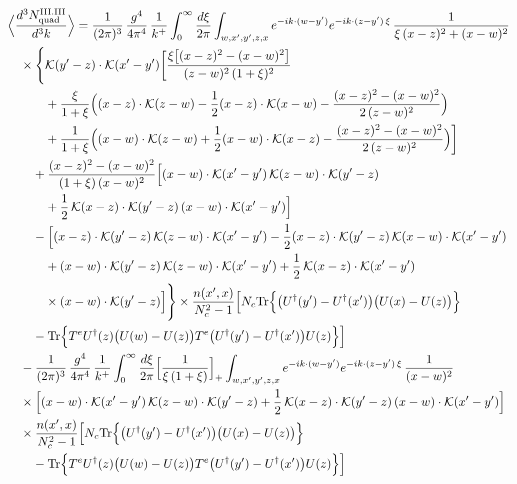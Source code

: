 \begingroup\small
\begin{align}\label{eq:S-III.III-2o}
&\Big\langle\frac{d^{3}N^{\rm III.III}_{{\rm quad}}}{d^{3}k}\Big\rangle=\frac{1}{(2\pi)^{3}}\, \frac{g^{4}}{4\pi^{4}}\, \frac{1}{k^{+}} \int_{0}^{\infty}\frac{d\xi}{2\pi} \int_{w,x',y',z,x}e^{-ik\cdot(w-y')}e^{-ik\cdot(z-y')\,\xi}\, \frac{1}{\xi\,(x-z)^{2}+(x-w)^{2}}\notag\\
&\quad \times\Bigg\{\Kv(y'-z)\cdot\Kv(x'-y')\bigg[\frac{\xi\big[(x-z)^{2}-(x-w)^{2}\big]}{(z-w)^{2}\,(1+\xi)^{2}}\notag\\
&\quad\quad\quad +\frac{\xi}{1+\xi}\Big((x-z)\cdot\Kv(z-w)-\frac{1}{2}(x-z)\cdot\Kv(x-w)-\frac{(x-z)^{2}-(x-w)^{2}}{2\,(z-w)^{2}}\Big)\notag\\
&\quad\quad\quad +\frac{1}{1+\xi}\Big((x-w)\cdot\Kv(z-w)+\frac{1}{2}(x-w)\cdot\Kv(x-z)-\frac{(x-z)^{2}-(x-w)^{2}}{2\,(z-w)^{2}}\Big)\bigg]\notag\\
&\quad\quad +\frac{(x-z)^{2}-(x-w)^{2}}{(1+\xi)\,(x-w)^{2}}\Big[(x-w)\cdot\Kv(x'-y')\, \Kv(z-w)\cdot\Kv(y'-z)\notag\\
&\quad\quad\quad +\frac{1}{2}\, \Kv(x-z)\cdot\Kv(y'-z)\, (x-w)\cdot\Kv(x'-y')\Big]\notag\\
&\quad\quad -\Big[(x-z)\cdot\Kv(y'-z)\, \Kv(z-w)\cdot\Kv(x'-y') -\frac{1}{2}(x-z)\cdot\Kv(y'-z)\, \Kv(x-w)\cdot\Kv(x'-y')\notag\\
&\quad\quad\quad +(x-w)\cdot\Kv(y'-z)\, \Kv(z-w)\cdot\Kv(x'-y') +\frac{1}{2}\, \Kv(x-z)\cdot\Kv(x'-y')\notag\\
&\quad\quad\quad \times (x-w)\cdot\Kv(y'-z)\Big]\Bigg\} \times\frac{n(x',x)}{N_{c}^{2}-1}\Big[ N_{c}{\rm Tr}\Big\{\big(U^{\dagger}(y')-U^{\dagger}(x')\big)\big(U(x)-U(z)\big)\Big\}\notag\\
&\quad\quad -{\rm Tr}\Big\{T^{e}U^{\dagger}(z)\big(U(w)-U(z)\big)T^{e}\big(U^{\dagger}(y')-U^{\dagger}(x')\big)U(z)\Big\}\Big]\notag\\
&\quad -\frac{1}{(2\pi)^{3}}\, \frac{g^{4}}{4\pi^{4}}\, \frac{1}{k^{+}} \int_{0}^{\infty}\frac{d\xi}{2\pi}\Big[\frac{1}{\xi\,(1+\xi)}\Big]_{+} \int_{w,x',y',z,x}e^{-ik\cdot(w-y')}e^{-ik\cdot(z-y')\,\xi}\, \frac{1}{(x-w)^{2}}\notag\\
&\quad \times\Big[(x-w)\cdot\Kv(x'-y')\, \Kv(z-w)\cdot\Kv(y'-z) +\frac{1}{2}\, \Kv(x-z)\cdot\Kv(y'-z)\, (x-w)\cdot\Kv(x'-y')\Big]\notag\\
&\quad \times\frac{n(x',x)}{N_{c}^{2}-1}\Big[ N_{c}{\rm Tr}\Big\{\big(U^{\dagger}(y')-U^{\dagger}(x')\big)\big(U(x)-U(z)\big)\Big\}\notag\\
&\quad\quad -{\rm Tr}\Big\{T^{e}U^{\dagger}(z)\big(U(w)-U(z)\big)T^{e}\big(U^{\dagger}(y')-U^{\dagger}(x')\big)U(z)\Big\}\Big]\notag\\

\end{align}
